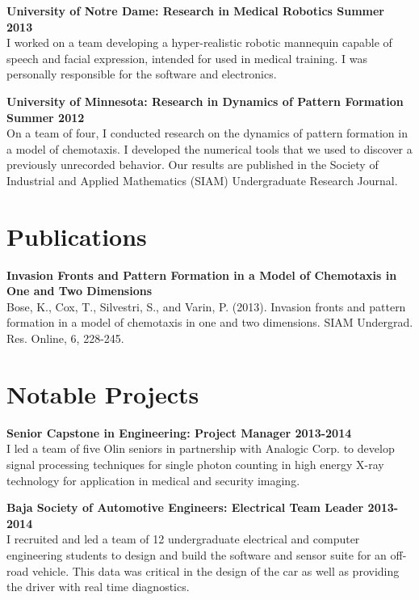 \documentclass{article}
\newcommand{\newitem}[2]{\noindent\textbf{#1 \hfill #2}\\}
\newcommand{\gimmespace}{\vspace{1em}}
\begin{document}
\newitem{University of Notre Dame: Research in Medical Robotics}{Summer 2013}
I worked on a team developing a hyper-realistic robotic mannequin capable of speech and facial expression, intended for used in medical training. I was personally responsible for the software and electronics.
\gimmespace

\newitem{University of Minnesota: Research in Dynamics of Pattern Formation}{Summer 2012}
On a team of four, I conducted research on the dynamics of pattern formation in a model of chemotaxis. I developed the numerical tools that we used to discover a previously unrecorded behavior. Our results are published in the Society of Industrial and Applied Mathematics (SIAM) Undergraduate Research Journal.

\section*{Publications}
\newitem{Invasion Fronts and Pattern Formation in a Model of Chemotaxis in One and Two Dimensions}{}
Bose, K., Cox, T., Silvestri, S., and Varin, P. (2013). Invasion fronts and pattern formation in a model of chemotaxis in one and two dimensions. SIAM Undergrad. Res. Online, 6, 228-245.

\section*{Notable Projects}
\newitem{Senior Capstone in Engineering: Project Manager}{2013-2014}
I led a team of five Olin seniors in partnership with Analogic Corp. to develop signal processing techniques for single photon counting in high energy X-ray technology for application in medical and security imaging.
\gimmespace

\newitem{Baja Society of Automotive Engineers: Electrical Team Leader}{2013-2014}
I recruited and led a team of 12 undergraduate electrical and computer engineering students to design and build the software and sensor suite for an off-road vehicle. This data was critical in the design of the car as well as providing the driver with real time diagnostics.
\end{document}
